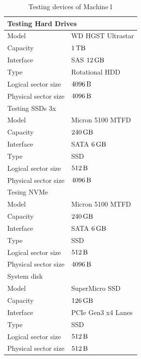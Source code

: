\documentclass[
  color, %
  table, %
  lof,   %
  lot,   %
]{fithesis3}
\begin{document}
\begin{table}
\centering
\begin{tabular}{|l|l|}
\hline
   \multicolumn{2}{|l|}{Testing Hard Drives} \\ \hline %
    Model & WD HGST Ultrastar\\
    \hline
    Capacity & $\SI{1}{\tera\byte}$  \\
    \hline
    Interface & SAS $\SI{12}{\giga\byte}$  \\
    \hline
    Type & Rotational HDD \\
    \hline    
    Logical sector size & $\SI{4096}{\byte}$ \\    
    \hline    
    Physical sector size & $\SI{4096}{\byte}$ \\
    \hline
    \hline
    \multicolumn{2}{|l|}{Testing SSDs 3x } \\ \hline %
     Model & Micron 5100 MTFD \\
    \hline
     Capacity & $\SI{240}{\giga\byte}$  \\
    \hline
    Interface & SATA $\SI{6}{\giga\byte}$  \\
    \hline
    Type & SSD \\
    \hline    
    Logical sector size & $\SI{512}{\byte}$ \\    
    \hline    
     Physical sector size & $\SI{4096}{\byte}$ \\
    \hline

    \hline
    \multicolumn{2}{|l|}{Tesing NVMe} \\ \hline %
     Model & Micron 5100 MTFD \\
    \hline
     Capacity & $\SI{240}{\giga\byte}$  \\
    \hline
    Interface & SATA $\SI{6}{\giga\byte}$  \\
    \hline
    Type & SSD \\
    \hline    
    Logical sector size & $\SI{512}{\byte}$ \\    
    \hline    
     Physical sector size & $\SI{4096}{\byte}$ \\

    \hline
    \multicolumn{2}{|l|}{System disk} \\ \hline %
    Model & SuperMicro SSD  \\
    \hline
    Capacity & $\SI{126}{\giga\byte}$  \\
    \hline
    Interface & PCIe Gen3 x4 Lanes  \\
    \hline
    Type & SSD \\
    \hline    
   Logical sector size & $\SI{512}{\byte}$ \\    
    \hline    
    Physical sector size & $\SI{512}{\byte}$ \\
    \hline   
\end{tabular}
\caption{Testing devices of Machine\,1}
\end{table}
\end{document}
